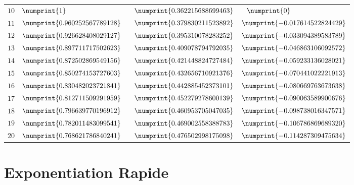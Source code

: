 \documentclass[a4paper]{article}
\begin{document}
\begin{center}
\begin{large}
\begin{tabular}{c||l||l|l}
$10$ & $\numprint{1}$ & $ \phantom{-}\numprint{0.362215688699463}$ & $ \phantom{-}\numprint{0} $\\

$11$ & $\numprint{0.960252567789128}$ & $ \phantom{-}\numprint{0.379830211523892}$ & $ \numprint{-0.017614522824429} $\\

$12$ & $\numprint{0.926628408029127}$ & $ \phantom{-}\numprint{0.395310078283252}$ & $ \numprint{-0.033094389583789} $\\

$13$ & $\numprint{0.897711717502623}$ & $ \phantom{-}\numprint{0.409078794792035}$ & $ \numprint{-0.046863106092572} $\\

$14$ & $\numprint{0.872502869549156}$ & $ \phantom{-}\numprint{0.421448824727484}$ & $ \numprint{-0.059233136028021} $\\

$15$ & $\numprint{0.850274153727603}$ & $ \phantom{-}\numprint{0.432656710921376}$ & $ \numprint{-0.070441022221913} $\\

$16$ & $\numprint{0.830482023721841}$ & $ \phantom{-}\numprint{0.442885452373101}$ & $ \numprint{-0.080669763673638} $\\

$17$ & $\numprint{0.812711509291959}$ & $ \phantom{-}\numprint{0.452279278600139}$ & $ \numprint{-0.090063589900676} $\\

$18$ & $\numprint{0.796639770196912}$ & $ \phantom{-}\numprint{0.460953705047035}$ & $ \numprint{-0.098738016347571} $\\

$19$ & $\numprint{0.782011483099541}$ & $ \phantom{-}\numprint{0.469002558388783}$ & $ \numprint{-0.106786869689320} $\\

$20$ & $\numprint{0.768621786840241}$ & $ \phantom{-}\numprint{0.476502998175098}$ & $ \numprint{-0.114287309475634} $\\

\end{tabular}
\end{large}
\end{center}


\pagebreak

\section{Exponentiation Rapide} \label{exponentiation_rapide}
\end{document}
